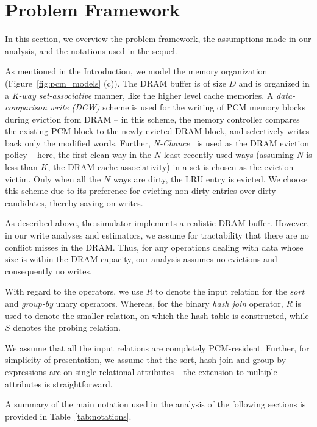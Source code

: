 \section{Problem Framework}
\label{assumptions}
In this section, we overview the problem framework, the assumptions made
in our analysis, and the notations used in the sequel.

As mentioned in the Introduction, we model the \model{} memory
organization (Figure~\ref{fig:pcm_models} (c)). The DRAM buffer is of
size $D$ and is organized in a \emph{K-way set-associative} manner, like the higher level cache memories.
A \textit{data-comparison write (DCW)} scheme \cite{write} is used for
the writing of PCM memory blocks during eviction from DRAM -- in this
scheme, the memory controller compares the existing PCM block to the newly
evicted DRAM block, and selectively writes back only the modified words.
Further, \textit{N-Chance}~\cite{nchance} is used as the DRAM eviction
policy -- here, the first clean way in the $N$ least recently used ways
(assuming $N$ is less than $K$, the DRAM cache associativity) in a set
is chosen as the eviction victim. Only when all the $N$ ways are dirty,
the LRU entry is evicted. We choose this scheme due to its preference
for evicting non-dirty entries over dirty candidates, thereby saving
on writes.

As described above, the simulator implements a realistic DRAM
buffer. However, in our write analyses and estimators, we assume for
tractability that there are no conflict misses in the DRAM. Thus, for
any operations dealing with data whose size is within the DRAM capacity,
our analysis assumes no evictions and consequently no writes.

With regard to the operators, we use $R$ to denote the input relation
for the \textit{sort} and \textit{group-by} unary operators.  Whereas,
for the binary \textit{hash join} operator, $R$ is used to denote the
smaller relation, on which the hash table is constructed, while $S$
denotes the probing relation. 

We assume that all the input relations are completely PCM-resident.
Further, for simplicity of presentation, we assume that the sort,
hash-join and group-by expressions are on single relational attributes --
the extension to multiple attributes is straightforward.

A summary of the main notation used in the analysis of the following
sections is provided in Table~\ref{tab:notations}.

